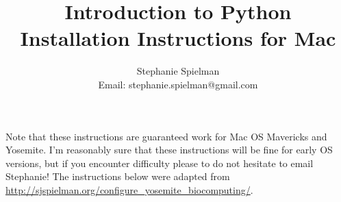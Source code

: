 \documentclass{article}
\begin{document}
\title{Introduction to Python \\ Installation Instructions for Mac}
\author{Stephanie Spielman \\ \footnotesize{Email: stephanie.spielman@gmail.com}}
\date{}
\maketitle{}

Note that these instructions are guaranteed work for Mac OS Mavericks and Yosemite. I'm reasonably sure that these instructions will be fine for early OS versions, but if you encounter difficulty please to do not hesitate to email Stephanie! The instructions below were adapted from \href{http://sjspielman.org/configure_yosemite_biocomputing/}
{http://sjspielman.org/configure\_yosemite\_biocomputing/}.
\end{document}

